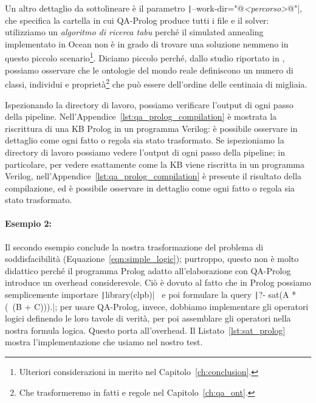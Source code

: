 Un altro dettaglio da sottolineare è il parametro \texttt|--work-dir="@\textit{<percorso>}@"|, che specifica la cartella in cui QA-Prolog produce tutti i file e il solver: utilizziamo un \emph{algoritmo di ricerca tabu} perché il simulated annealing implementato in Ocean non è in grado di trovare una soluzione nemmeno in questo piccolo scenario\footnote{Ulteriori considerazioni in merito nel Capitolo~\ref{ch:conclusion}.}. Diciamo piccolo perché, dallo studio riportato in \cite{zhang2010measuring}, possiamo osservare che le ontologie del mondo reale definiscono un numero di classi, individui e proprietà\footnote{Che trasformeremo in fatti e regole nel Capitolo~\ref{ch:qa_ont}.} che può essere dell'ordine delle centinaia di migliaia.

Ispezionando la directory di lavoro, possiamo verificare l'output di ogni passo della pipeline. Nell'Appendice~\ref{lst:qa_prolog_compilation} è mostrata la riscrittura di una KB Prolog in un programma Verilog: è possibile osservare in dettaglio come ogni fatto o regola sia stato trasformato.
Se ispezioniamo la directory di lavoro possiamo vedere l'output di ogni passo della pipeline; in particolare, per vedere esattamente come la KB viene riscritta in un programma Verilog, nell'Appendice~\ref{lst:qa_prolog_compilation} è presente il risultato della compilazione, ed è possibile osservare in dettaglio come ogni fatto o regola sia stato trasformato.

\paragraph{Esempio 2: }\label{ex:sat_prolog} Il secondo esempio conclude la nostra trasformazione del problema di soddisfacibilità (Equazione~\ref{eqn:simple_logic}); purtroppo, questo non è molto didattico perché il programma Prolog adatto all'elaborazione con QA-Prolog introduce un overhead considerevole. Ciò è dovuto al fatto che in Prolog possiamo semplicemente importare \texttt|library(clpb)|~\cite{triska2018boolean} e poi formulare la query \texttt|?- sat(A * (~(B + C))).|; per usare QA-Prolog, invece, dobbiamo implementare gli operatori logici definendo le loro tavole di verità, per poi assemblare gli operatori nella nostra formula logica. Questo porta all'overhead. Il Listato~\ref{lst:sat_prolog} mostra l'implementazione che usiamo nel nostro test.
\begin{listingenv}[h]
	\caption{Soddisfacibilità in Prolog}
	\label{lst:sat_prolog}
\end{listingenv}

